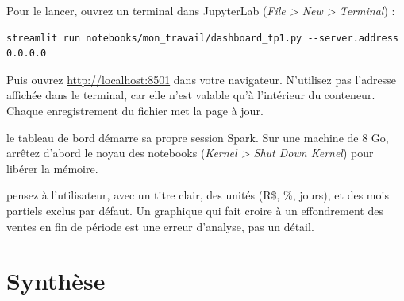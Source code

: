 Pour le lancer, ouvrez un terminal dans JupyterLab (\emph{File > New > Terminal}) :
\begin{lstlisting}[style=shell]
streamlit run notebooks/mon_travail/dashboard_tp1.py --server.address 0.0.0.0
\end{lstlisting}
Puis ouvrez \url{http://localhost:8501} dans votre navigateur. N'utilisez pas l'adresse
 affichée dans le terminal, car elle n'est valable qu'à l'intérieur du conteneur.
Chaque enregistrement du fichier met la page à jour.


\begin{attention}
le tableau de bord démarre sa propre session Spark. Sur une machine de 8 Go, arrêtez d'abord le
noyau des notebooks (\emph{Kernel > Shut Down Kernel}) pour libérer la mémoire.
\end{attention}

\begin{astuce}
pensez à l'utilisateur, avec un titre clair, des unités (R\$, \%, jours), et des mois partiels exclus par
défaut. Un graphique qui fait croire à un effondrement des ventes en fin de période est une erreur
d'analyse, pas un détail.
\end{astuce}

\section{Synthèse}\label{c3:sec:livrables}

